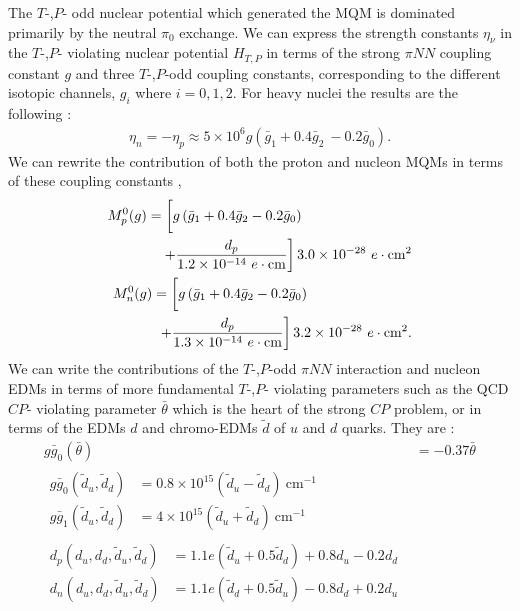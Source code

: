 \documentclass[10pt,a4paper, twoside]{report}
\begin{document}
The $T$-,$P$- odd nuclear potential which generated the MQM is dominated primarily by the neutral $\pi_0$ exchange. We can express the strength constants $\eta_{\nu}$ in the  $T$-,$P$- violating nuclear potential $H_{T,P}$  in terms of the strong $\pi NN$ coupling constant $g$ and three $T$-,$P$-odd coupling constants, corresponding to the different isotopic  channels,  $g_i$ where $i=0,1,2$. For heavy nuclei the results are the following  \cite{Dmitriev1994, SFK1984}:
\begin{align}
\eta_{n} = -\eta_{p} \approx 5\times 10^{6}g\left(\bar{g}_1 + 0.4 \bar{g}_2\ - 0.2\bar{g}_0\right) .
\end{align}
We can rewrite the contribution of both the proton and nucleon MQMs in terms of these coupling constants \cite{Flambaum1994, Vorov1995},
\begin{align} 
\begin{split}
M_{p}^0(g) &= \left[ \vphantom{\dfrac{1}{2}} g\left(\bar{g}_1 + 0.4\bar{g}_2 - 0.2\bar{g}_0\right) \right. \\
&\quad \left. + \dfrac{d_{p}}{1.2 \times 10^{-14} \ e\cdot\text{cm}}\right]3.0 \times 10^{-28} \ e\cdot\text{cm}^2 
\end{split}\label{eq:MQM_pion_p} \\
\begin{split}
M_{n}^0(g) &= \left[ \vphantom{\dfrac{1}{2}} g\left(\bar{g}_1 + 0.4\bar{g}_2 - 0.2\bar{g}_0\right) \right. \\
& \ \left. + \dfrac{d_{p}}{1.3 \times 10^{-14} \ e\cdot\text{cm}}\right]3.2 \times 10^{-28} \ e\cdot\text{cm}^2. 
\end{split} \label{eq:MQM_pion_n}
\end{align}
We can write the contributions of the $T$-,$P$-odd $\pi NN$ interaction and nucleon EDMs in terms of more fundamental $T$-,$P$- violating parameters such as the  QCD $CP$- violating parameter $\bar{\theta}$ which is the heart of the strong $CP$ problem,  or in terms of the EDMs  $d$ and chromo-EDMs $\tilde{d}$ of $u$ and $d$ quarks. They are \cite{ Crewther1979,Pospelov1999, Pospelov2005, Alexandrou2017, JLQCD, PNDME2018}:
\begin{align}
g\bar{g}_0(\bar{\theta})&= -0.37 \bar{\theta} \\
\begin{split}
g\bar{g}_0(\tilde{d}_u, \tilde{d}_d)&= 0.8\times 10^{15} \left(\tilde{d}_u - \tilde{d}_{d}\right) \ \text{cm}^{-1} \\
g\bar{g}_1(\tilde{d}_u, \tilde{d}_d)&= 4\times 10^{15} \left(\tilde{d}_u + \tilde{d}_{d}\right) \ \text{cm}^{-1}
\end{split} \label{eq:EDM_Chromo_1} \\
\begin{split}
d_{p}(d_u, d_d, \tilde{d}_u, \tilde{d}_d) &= 1.1e\left(\tilde{d}_u + 0.5\tilde{d}_{d}\right) + 0.8 d_u - 0.2d_d \\
d_{n}(d_u, d_d, \tilde{d}_u, \tilde{d}_d) &= 1.1e\left(\tilde{d}_d + 0.5\tilde{d}_{u}\right) - 0.8 d_d + 0.2d_u
\end{split} \label{eq:EDM_Chromo_2}
\end{align}
\end{document}
